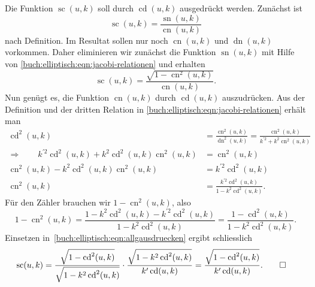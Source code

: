 \begin{beispiel}
Die Funktion $\operatorname{sc}(u,k)$ soll durch $\operatorname{cd}(u,k)$
ausgedrückt werden.
Zunächst ist 
\[
\operatorname{sc}(u,k)
=
\frac{\operatorname{sn}(u,k)}{\operatorname{cn}(u,k)}
\]
nach Definition.
Im Resultat sollen nur noch $\operatorname{cn}(u,k)$ und
$\operatorname{dn}(u,k)$ vorkommen.
Daher eliminieren wir zunächst die Funktion $\operatorname{sn}(u,k)$
mit Hilfe von \eqref{buch:elliptisch:eqn:jacobi-relationen} und erhalten
\begin{equation}
\operatorname{sc}(u,k)
=
\frac{\sqrt{1-\operatorname{cn}^2(u,k)}}{\operatorname{cn}(u,k)}.
\label{buch:elliptisch:eqn:allgausdruecken}
\end{equation}
Nun genügt es, die Funktion $\operatorname{cn}(u,k)$ durch
$\operatorname{cd}(u,k)$ auszudrücken.
Aus der Definition und der
dritten Relation in \eqref{buch:elliptisch:eqn:jacobi-relationen} 
erhält man
\begin{align*}
\operatorname{cd}^2(u,k)
&=
\frac{\operatorname{cn}^2(u,k)}{\operatorname{dn}^2(u,k)}
=
\frac{\operatorname{cn}^2(u,k)}{k^{\prime2}+k^2\operatorname{cn}^2(u,k)}
\\
\Rightarrow
\qquad
k^{\prime 2}
\operatorname{cd}^2(u,k)
+
k^2\operatorname{cd}^2(u,k)\operatorname{cn}^2(u,k)
&=
\operatorname{cn}^2(u,k)
\\
\operatorname{cn}^2(u,k)
-
k^2\operatorname{cd}^2(u,k)\operatorname{cn}^2(u,k)
&=
k^{\prime 2}
\operatorname{cd}^2(u,k)
\\
\operatorname{cn}^2(u,k)
&=
\frac{
k^{\prime 2}
\operatorname{cd}^2(u,k)
}{
1 - k^2\operatorname{cd}^2(u,k)
}.
\end{align*}
Für den Zähler brauchen wir $1-\operatorname{cn}^2(u,k)$, also
\[
1-\operatorname{cn}^2(u,k)
=
\frac{
1
-
k^2\operatorname{cd}^2(u,k)
-
k^{\prime 2}
\operatorname{cd}^2(u,k)
}{
1
-
k^2\operatorname{cd}^2(u,k)
}
=
\frac{1-\operatorname{cd}^2(u,k)}{1-k^2\operatorname{cd}^2(u,k)}.
\]
Einsetzen in~\eqref{buch:elliptisch:eqn:allgausdruecken} ergibt schliesslich
\begin{align*}
\operatorname{sc}(u,k)
&=
\frac{
\sqrt{1-\operatorname{cd}^2(u,k)}
}{\sqrt{1-k^2\operatorname{cd}^2(u,k)}}
\cdot
\frac{
\sqrt{1 - k^2\operatorname{cd}^2(u,k)}
}{
k'
\operatorname{cd}(u,k)
}
=
\frac{
\sqrt{1-\operatorname{cd}^2(u,k)}
}{
k'
\operatorname{cd}(u,k)
}.
\qedhere
\end{align*}
\end{beispiel}

